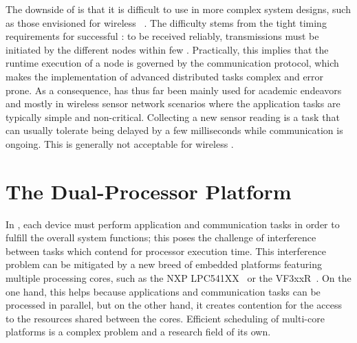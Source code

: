 The downside of \ST is that it is difficult to use in more complex system designs, such as those envisioned for wireless \CPS~\cite{akerberg2011Future}.
The difficulty stems from the tight timing requirements for successful \ST: to be received reliably, transmissions must be initiated by the different nodes within few \us.
Practically, this implies that the runtime execution of a node is governed by the communication protocol, which makes the implementation of advanced distributed tasks complex and error prone.
As a consequence, \ST has thus far been mainly used for academic endeavors and mostly in wireless sensor network scenarios where the application tasks are typically simple and non-critical.
Collecting a new sensor reading is a task that can usually tolerate being delayed by a few milliseconds while communication is ongoing.\linebreak
This is generally not acceptable for wireless \CPS.

\section{The Dual-Processor Platform}
\label{sec:dpp}

In \CPS, each device must perform application and communication tasks in order to fulfill the overall system functions; this poses the challenge of interference between tasks which contend for processor execution time.
This interference problem can be mitigated by a new breed of embedded platforms featuring multiple processing cores, such as the NXP LPC541XX~\cite{nxpLPC541XX} or the VF3xxR~\cite{nxpVF3xxR}.
On the one hand, this helps because applications and communication tasks can be processed in parallel, but on the other hand, it creates contention for the access to the resources shared between the cores.
Efficient scheduling of multi-core platforms is a complex problem and a research field of its own.


